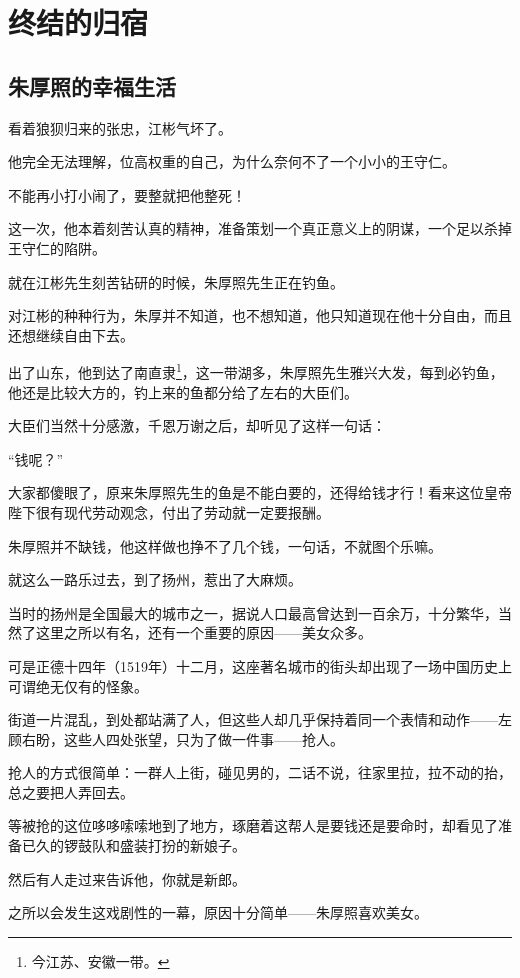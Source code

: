 \section{终结的归宿}
\ifnum{}
	\begin{multicols}{\theparacolNo}
\fi
\subsection{朱厚照的幸福生活}
看着狼狈归来的张忠，江彬气坏了。

他完全无法理解，位高权重的自己，为什么奈何不了一个小小的王守仁。

不能再小打小闹了，要整就把他整死！

这一次，他本着刻苦认真的精神，准备策划一个真正意义上的阴谋，一个足以杀掉王守仁的陷阱。

就在江彬先生刻苦钻研的时候，朱厚照先生正在钓鱼。

对江彬的种种行为，朱厚并不知道，也不想知道，他只知道现在他十分自由，而且还想继续自由下去。

出了山东，他到达了南直隶\footnote{今江苏、安徽一带。}，这一带湖多，朱厚照先生雅兴大发，每到必钓鱼，他还是比较大方的，钓上来的鱼都分给了左右的大臣们。

大臣们当然十分感激，千恩万谢之后，却听见了这样一句话：

“钱呢？”

大家都傻眼了，原来朱厚照先生的鱼是不能白要的，还得给钱才行！看来这位皇帝陛下很有现代劳动观念，付出了劳动就一定要报酬。

朱厚照并不缺钱，他这样做也挣不了几个钱，一句话，不就图个乐嘛。

就这么一路乐过去，到了扬州，惹出了大麻烦。

当时的扬州是全国最大的城市之一，据说人口最高曾达到一百余万，十分繁华，当然了这里之所以有名，还有一个重要的原因——美女众多。

可是正德十四年（1519年）十二月，这座著名城市的街头却出现了一场中国历史上可谓绝无仅有的怪象。

街道一片混乱，到处都站满了人，但这些人却几乎保持着同一个表情和动作——左顾右盼，这些人四处张望，只为了做一件事——抢人。

抢人的方式很简单：一群人上街，碰见男的，二话不说，往家里拉，拉不动的抬，总之要把人弄回去。

等被抢的这位哆哆嗦嗦地到了地方，琢磨着这帮人是要钱还是要命时，却看见了准备已久的锣鼓队和盛装打扮的新娘子。

然后有人走过来告诉他，你就是新郎。

之所以会发生这戏剧性的一幕，原因十分简单——朱厚照喜欢美女。


\end{multicols}
